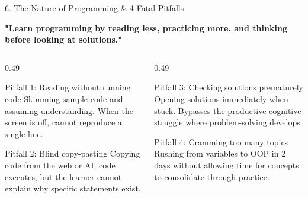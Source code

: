 \documentclass[aspectratio=169, 10pt]{beamer}
\begin{document}
\begin{frame}{6. The Nature of Programming \& 4 Fatal Pitfalls}
  \begin{tcolorbox}[colback=accentorange!12, colframe=accentorange, arc=3pt, left=6pt, right=6pt, top=2.5pt, bottom=2.5pt]
    \centering\footnotesize\bfseries
    "Learn programming by reading less, practicing more, and thinking before looking at solutions."
  \end{tcolorbox}
  \vspace{0.06cm}
  \begin{columns}[T]
    \begin{column}{0.49\textwidth}
      \begin{cbox}[accentorange]{Pitfall 1: Reading without running code}
        \scriptsize
        Skimming sample code and assuming understanding. When the screen is off, cannot reproduce a single line.
      \end{cbox}
      \vspace{0.06cm}
      \begin{cbox}[accentorange]{Pitfall 2: Blind copy-pasting}
        \scriptsize
        Copying code from the web or AI; code executes, but the learner cannot explain why specific statements exist.
      \end{cbox}
    \end{column}
    \begin{column}{0.49\textwidth}
      \begin{cbox}[accentorange]{Pitfall 3: Checking solutions prematurely}
        \scriptsize
        Opening solutions immediately when stuck. Bypasses the productive cognitive struggle where problem-solving develops.
      \end{cbox}
      \vspace{0.06cm}
      \begin{cbox}[accentorange]{Pitfall 4: Cramming too many topics}
        \scriptsize
        Rushing from variables to OOP in 2 days without allowing time for concepts to consolidate through practice.
      \end{cbox}
    \end{column}
  \end{columns}
\end{frame}
\end{document}
